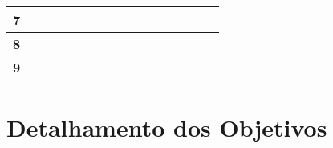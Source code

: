 \begin{table}[htb!]
\begin{tabular}{c|c|c|c|c|c|c|c|c|c|c|c|c|c|c|c|}
\multicolumn{1}{|c|}{{\bf 7}}         &         &         &               &         &         &         &         &         &         &          &         &         &         &         &         \\ \hline
\multicolumn{1}{|c|}{{\bf 8}}         &         &         &               &         &         &         &         &         &         &          &         &         &         &         &         \\ \hline
\multicolumn{1}{|c|}{{\bf 9}}         &         &         &               &         &         &         &         &         &         &          &         &         &         &         &         \\ \hline
\end{tabular}
\end{table}

\section{Detalhamento dos Objetivos}

